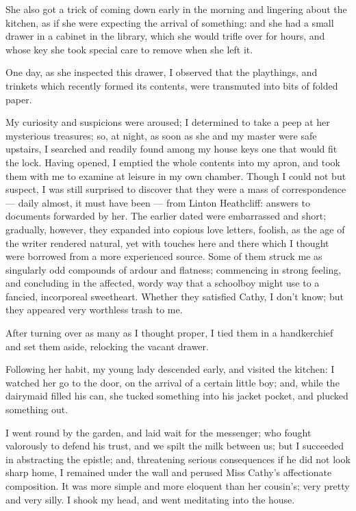 \par She also got a trick of coming down early in the morning and lingering about the kitchen, as if she were expecting the arrival of something: and she had a small drawer in a cabinet in the library, which she would trifle over for hours, and whose key she took special care to remove when she left it.
\par One day, as she inspected this drawer, I observed that the playthings, and trinkets which recently formed its contents, were transmuted into bits of folded paper.
\par My curiosity and suspicions were aroused; I determined to take a peep at her mysterious treasures; so, at night, as soon as she and my master were safe upstairs, I searched and readily found among my house keys one that would fit the lock. Having opened, I emptied the whole contents into my apron, and took them with me to examine at leisure in my own chamber. Though I could not but suspect, I was still surprised to discover that they were a mass of correspondence — daily almost, it must have been — from Linton Heathcliff: answers to documents forwarded by her. The earlier dated were embarrassed and short; gradually, however, they expanded into copious love letters, foolish, as the age of the writer rendered natural, yet with touches here and there which I thought were borrowed from a more experienced source. Some of them struck me as singularly odd compounds of ardour and flatness; commencing in strong feeling, and concluding in the affected, wordy way that a schoolboy might use to a fancied, incorporeal sweetheart. Whether they satisfied Cathy, I don't know; but they appeared very worthless trash to me.
\par After turning over as many as I thought proper, I tied them in a handkerchief and set them aside, relocking the vacant drawer.
\par Following her habit, my young lady descended early, and visited the kitchen: I watched her go to the door, on the arrival of a certain little boy; and, while the dairymaid filled his can, she tucked something into his jacket pocket, and plucked something out.
\par I went round by the garden, and laid wait for the messenger; who fought valorously to defend his trust, and we spilt the milk between us; but I succeeded in abstracting the epistle; and, threatening serious consequences if he did not look sharp home, I remained under the wall and perused Miss Cathy's affectionate composition. It was more simple and more eloquent than her cousin's; very pretty and very silly. I shook my head, and went meditating into the house.
